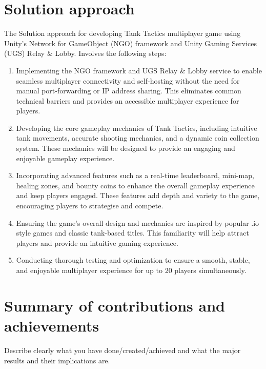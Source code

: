 \section{Solution approach}
\label{sec:intro_sol} %
The Solution approach for developing Tank Tactics multiplayer game using Unity's Network for GameObject (NGO) framework and Unity Gaming Services (UGS) Relay \& Lobby. Involves the following steps:
\begin{enumerate}
    \item Implementing the NGO framework and UGS Relay \& Lobby service to enable seamless multiplayer connectivity and self-hosting without the need for manual port-forwarding or IP address sharing. This eliminates common technical barriers and provides an accessible multiplayer experience for players.
    \item Developing the core gameplay mechanics of Tank Tactics, including intuitive tank movements, accurate shooting mechanics, and a dynamic coin collection system. These mechanics will be designed to provide an engaging and enjoyable gameplay experience.
    \item Incorporating advanced features such as a real-time leaderboard, mini-map, healing zones, and bounty coins to enhance the overall gameplay experience and keep players engaged. These features add depth and variety to the game, encouraging players to strategise and compete.
    \item Ensuring the game's overall design and mechanics are inspired by popular .io style games and classic tank-based titles. This familiarity will help attract players and provide an intuitive gaming experience.
    \item Conducting thorough testing and optimization to ensure a smooth, stable, and enjoyable multiplayer experience for up to 20 players simultaneously.
\end{enumerate}

\section{Summary of contributions and achievements} %
\label{sec:intro_sum_results} %
Describe clearly what you have done/created/achieved and what the major results and their implications are. 


